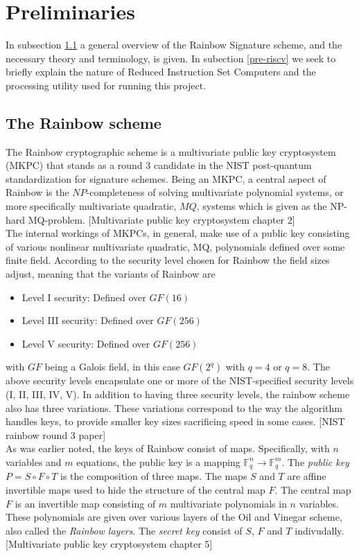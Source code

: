 \section{Preliminaries}
In subsection \ref{rainscheme} a general overview of the Rainbow Signature scheme, and the necessary theory and terminology, is given. In subection \ref{pre-riscv} we seek to briefly explain the nature of Reduced Instruction Set Computers and the processing utility used for running this project.
\subsection{The Rainbow scheme} \label{rainscheme}
The Rainbow cryptographic scheme is a multivariate public key cryptosystem (MKPC) that stands as a round 3 candidate in the NIST post-quantum standardization for signature schemes. Being an MKPC, a central aspect of Rainbow is the $NP$-completeness of solving multivariate polynomial systems, or more specifically multivariate quadratic, $MQ$, systems which is given as the NP-hard MQ-problem. [Multivariate public key cryptosystem chapter 2]
\medskip\\
The internal workings of MKPCs, in general, make use of a public key consisting of various nonlinear multivariate quadratic, MQ, polynomials defined over some finite field. According to the security level chosen for Rainbow the field sizes adjust, meaning that the variants of Rainbow are 
\begin{itemize}
    \item Level I security: Defined over $GF(16)$
    \item Level III security: Defined over $GF(256)$
    \item Level V security: Defined over $GF(256)$
\end{itemize}
with $GF$ being a Galois field, in this case $GF(2^q)$ with $q = 4$ or $q=8$. The above security levels encapsulate one or more of the NIST-specified security levels (I, II, III, IV, V). In addition to having three security levels, the rainbow scheme also has three variations. These variations correspond to the way the algorithm handles keys, to provide smaller key sizes sacrificing speed in some cases. [NIST rainbow round 3 paper]\medskip\\
As was earlier noted, the keys of Rainbow consist of maps. Specifically, with $n$ variables and $m$ equations, the public key is a mapping $\mathbb{F}_q^n \rightarrow \mathbb{F}_q^m$. The \textit{public key} $P = S \circ F \circ T$ is the composition of three maps. The maps $S$ and $T$ are affine invertible maps used to hide the structure of the central map $F$. The central map $F$ is an invertible map consisting of $m$ multivariate polynomials in $n$ variables. These polynomials are given over various layers of the Oil and Vinegar scheme, also called the \textit{Rainbow layers}. The \textit{secret key} consist of $S$, $F$ and $T$ indivudally.[Multivariate public key cryptosystem chapter 5]\medskip\\
